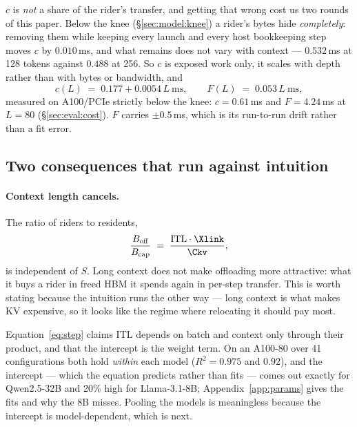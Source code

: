 $c$ is \emph{not} a share of the rider's transfer, and getting that wrong cost us
two rounds of this paper. Below the knee (\S\ref{sec:model:knee}) a rider's bytes
hide \emph{completely}: removing them while keeping every launch and every host
bookkeeping step moves $c$ by $0.010$\,ms, and what remains does not vary with
context --- $0.532$\,ms at 128 tokens against $0.488$ at 256. So $c$ is exposed
work only, it scales with depth rather than with bytes or bandwidth, and
\begin{equation}
\label{eq:coeffs}
c(L) \;=\; 0.177 + 0.0054\,L \ \mathrm{ms},
\qquad
F(L) \;=\; 0.053\,L \ \mathrm{ms},
\end{equation}
measured on A100/PCIe strictly below the knee: $c = 0.61$\,ms and $F = 4.24$\,ms at
$L = 80$ (\S\ref{sec:eval:cost}). $F$ carries $\pm 0.5$\,ms, which is its
run-to-run drift rather than a fit error.

\subsection{Two consequences that run against intuition}
\label{sec:model:cancel}

\paragraph{Context length cancels.} The ratio of riders to residents,
%
\begin{equation}
\label{eq:cancel}
\frac{B_{\mathrm{off}}}{B_{\mathrm{cap}}}
  \;=\; \frac{\mathrm{ITL}\cdot \Xlink}{\Ckv},
\end{equation}
%
is independent of $S$. Long context does not make offloading more attractive: what
it buys a rider in freed HBM it spends again in per-step transfer. This is worth
stating because the intuition runs the other way --- long context is what makes KV
expensive, so it looks like the regime where relocating it should pay most.

Equation~\ref{eq:step} claims ITL depends on batch and context only through their
product, and that the intercept is the weight term. On an A100-80 over 41
configurations both hold \emph{within} each model ($R^2 = 0.975$ and $0.92$), and
the intercept --- which the equation predicts rather than fits --- comes out exactly
for Qwen2.5-32B and 20\% high for Llama-3.1-8B; Appendix~\ref{app:params} gives the
fits and why the 8B misses. Pooling the models is meaningless because the intercept
is model-dependent, which is next.

